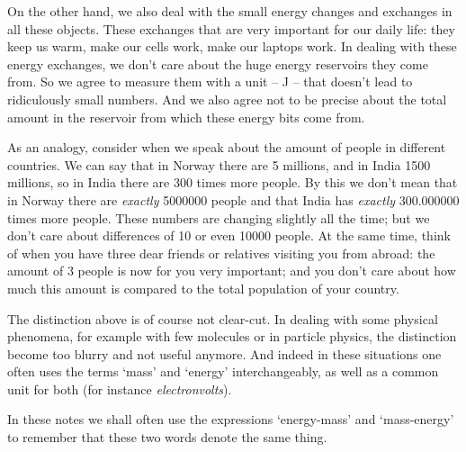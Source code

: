 \documentclass[a4paper,12pt,%
onecolumn,oneside,titlepage,%
british%
]{memoir}
\providecommand{\href}[2]{#2}
\renewcommand*{\|}[1][]{\nonscript\:#1\vert\nonscript\:\mathopen{}}
\newcommand*{\furl}[2]{\href{#1}{#2}\pagenote{\url{#1}}}
\newcommand*{\energym}{energy-mass}
\newcommand*{\masse}{mass-energy}
\begin{document}
On the other hand, we also deal with the small energy changes and exchanges in all these objects. These exchanges that are very important for our daily life: they keep us warm, make our cells work, make our laptops work. In dealing with these energy exchanges, we don't care about the huge energy reservoirs they come from. So we agree to measure them with a unit -- \unit{J} -- that doesn't lead to ridiculously small numbers. And we also agree not to be precise about the total amount in the reservoir from which these energy bits come from.

As an analogy, consider when we speak about the amount of people in different countries. We can say that in Norway there are \num{5} millions, and in India \num{1500} millions, so in India there are \num{300} times more people. By this we don't mean that in Norway there are \emph{exactly} \num{5000000} people and that India has \emph{exactly} \num{300.000000} times more people. These numbers are changing slightly all the time; but we don't care about differences of 10 or even \num{10000} people. At the same time, think of when you have three dear friends or relatives visiting you from abroad: the amount of \num{3} people is now for you very important; and you don't care about how much this amount is compared to the total population of your country.

\smallskip

The distinction above is of course not clear-cut. In dealing with some physical phenomena, for example with few molecules or in particle physics, the distinction become too blurry and not useful anymore. And indeed in these situations one often uses the terms \enquote*{mass} and \enquote*{energy} interchangeably, as well as a common unit for both (for instance \furl{https://home.cern/tags/13-tev}{\emph{electronvolts}}).

\medskip

In these notes we shall often use the expressions \enquote*{\energym} and \enquote*{\masse} to remember that these two words denote the same thing.
\end{document}
